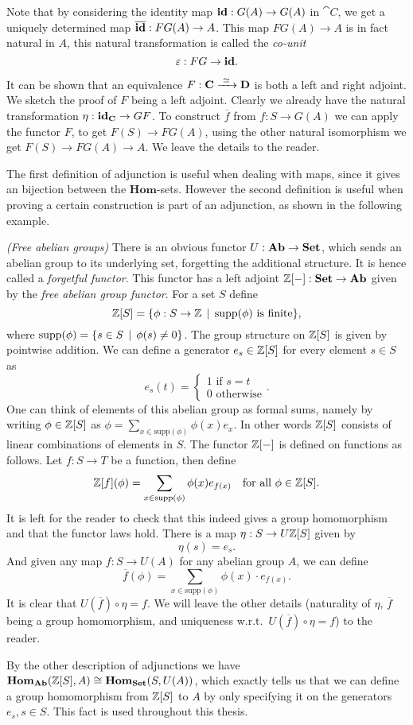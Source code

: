 Note that by considering the identity map $\mathbf{id} : G(A) \to G(A)$ in $\cat{C}$, we get a uniquely determined map $\overline{\mathbf{id}}:FG(A) \to A$. This map $FG(A) \to A$ is in fact natural in $A$, this natural transformation is called the \emph{co-unit}
$$ \varepsilon: FG \to \mathbf{id}. $$

It can be shown that an equivalence $F: \mathbf{C} \xrightarrow{\,\,{\simeq}\,\,} \mathbf{D}$ is both a left and right adjoint. We sketch the proof of $F$ being a left adjoint. Clearly we already have the natural transformation $\eta: \mathbf{id}_{\mathbf{C}} \to GF$. To construct $\overline{f}$ from $f: S \to G(A)$ we can apply the functor $F$, to get $F(S) \to FG(A)$, using the other natural isomorphism we get $F(S) \to FG(A) \to A$. We leave the details to the reader.

The first definition of adjunction is useful when dealing with maps, since it gives an bijection between the $\mathbf{Hom}$-sets. However the second definition is useful when proving a certain construction is part of an adjunction, as shown in the following example.

\begin{example}
	\emph{(Free abelian groups)} There is an obvious functor $U: \mathbf{Ab} \to \mathbf{Set}$, which sends an abelian group to its underlying set, forgetting the additional structure. It is hence called a \emph{forgetful functor}. This functor has a left adjoint $\mathbb{Z}[-]: \mathbf{Set} \to \mathbf{Ab}$  given by the \emph{free abelian group functor}. For a set $S$ define
	$$ \mathbb{Z}[S] = \{ \phi: S \to \mathbb{Z} \,\mid\, \text{supp}(\phi) \text{ is finite}\}, $$
	where $\text{supp}(\phi) = \{ s \in S \,\mid\, \phi(s) \neq 0 \}$. The group structure on $\mathbb{Z}[S]$ is given by pointwise addition. We can define a generator $e_s \in \mathbb{Z}[S]$ for every element $s \in S$ as
	$$ e_s(t) =
	\begin{cases}
		1 \text{ if } s = t \\
		0 \text{ otherwise}
	\end{cases}. $$
	One can think of elements of this abelian group as formal sums, namely by writing $\phi \in \mathbb{Z}[S]$ as $\phi = \sum_{x \in \text{supp}(\phi)}\phi(x) e_x$. In other words $\mathbb{Z}[S]$ consists of linear combinations of elements in $S$. The functor $\mathbb{Z}[-]$ is defined on functions as follows. Let $f: S \to T$ be a function, then define
	$$ \mathbb{Z}[f](\phi) = \sum_{x \in \text{supp}(\phi)} \phi(x) e_{f(x)} \quad\text{for all } \phi \in \mathbb{Z}[S]. $$
	It is left for the reader to check that this indeed gives a group homomorphism and that the functor laws hold. There is a map $\eta: S \to U\mathbb{Z}[S]$ given by
	$$ \eta(s) = e_s. $$
	And given any map $f: S \to U(A)$ for any abelian group $A$, we can define
	$$ \overline{f}(\phi) = \sum_{x \in \text{supp}(\phi)} \phi(x) \cdot e_{f(x)}. $$
	It is clear that $U(\overline{f}) \circ \eta = f$. We will leave the other details (naturality of $\eta$, $\overline{f}$ being a group homomorphism, and uniqueness w.r.t.~$U(\overline{f}) \circ \eta = f$) to the reader.

	By the other description of adjunctions we have $\mathbf{Hom}_{\mathbf{Ab}}(\mathbb{Z}[S], A) \cong \mathbf{Hom}_{\mathbf{Set}}(S, U(A))$, which exactly tells us that we can define a group homomorphism from $\mathbb{Z}[S]$ to $A$ by only specifying it on the generators $e_s, s \in S$. This fact is used throughout this thesis.
\end{example}

